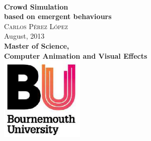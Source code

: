 
\begin{titlepage}

\begin{center}

~\\[4.0cm]
{ \huge \bfseries Crowd Simulation}\\[0.5cm]
{ \Large \bfseries based on emergent behaviours}\\[1.0cm]

{\large
\textsc{Carlos Pérez López}\\[1.5cm]


{\large August, 2013}\\[3.5cm]


\textbf{Master of Science,}\\[0.25cm]
\textbf{Computer Animation and Visual Effects}\\[1.0cm]

\includegraphics[width=0.3\textwidth]{img/bu_logo}\\[1cm]

}

\vfill

\end{center}

\end{titlepage}



\section*{}

